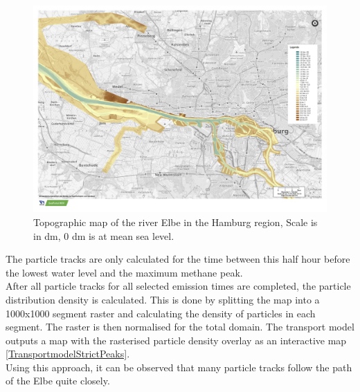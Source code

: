 \begin{figure}[htbp]
 \centering
 \includegraphics[width=1\textwidth]{figures/Appendix/Map/TopographieElbeHamburg.jpg}
 \caption[Topographic map of Elbe in Hamburg]{Topographic map of the river Elbe in the Hamburg region, Scale is in dm, 0 dm is at mean sea level. \cite{ZDMGDWS.2016}}
 \label{TopographyElbeHamburg}
\end{figure}
The particle tracks are only calculated for the time between this half hour before the lowest water level and the maximum methane peak. \\
After all particle tracks for all selected emission times are completed, the particle distribution density is calculated. This is done by splitting the map into a 1000x1000 segment raster and calculating the density of particles in each segment. The raster is then normalised for the total domain. The transport model outputs a map with the rasterised particle density overlay as an interactive map \cref{TransportmodelStrictPeaks}.\\
Using this approach, it can be observed that many particle tracks follow the path of the  Elbe quite closely. 

